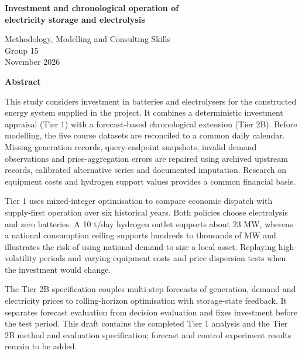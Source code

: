 \documentclass[11pt,a4paper,oneside]{article}
\begin{document}
\begin{center}
{\Large\bfseries Investment and chronological operation of\\[3pt]
electricity storage and electrolysis\par}
\vspace{12pt}
Methodology, Modelling and Consulting Skills\\
Group 15\\
November 2026
\end{center}
\vspace{16pt}
\begin{center}\large\bfseries Abstract\end{center}
\noindent
This study considers investment in batteries and electrolysers for the
constructed energy system supplied in the project. It combines a deterministic
investment appraisal (Tier 1) with a forecast-based chronological extension
(Tier 2B). Before modelling, the five course datasets are reconciled to a
common daily calendar. Missing generation records, query-endpoint snapshots,
invalid demand observations and price-aggregation errors are repaired using
archived upstream records, calibrated alternative series and documented
imputation. Research on equipment costs and hydrogen support values provides
a common financial basis.

Tier 1 uses mixed-integer optimisation to compare economic dispatch with
supply-first operation over six historical years. Both policies choose
electrolysis and zero batteries. A 10 t/day hydrogen outlet supports about
23 MW, whereas a national consumption ceiling supports hundreds to thousands
of MW and illustrates the risk of using national demand to size a local asset.
Replaying high-volatility periods and varying equipment costs and price
dispersion tests when the investment would change.

The Tier 2B specification couples multi-step forecasts of generation, demand
and electricity prices to rolling-horizon optimisation with storage-state
feedback. It separates forecast evaluation from decision evaluation and fixes
investment before the test period. This draft contains the completed Tier 1
analysis and the Tier 2B method and evaluation specification; forecast and
control experiment results remain to be added.
\clearpage
\tableofcontents
\clearpage
{}



\label{body-last}
\clearpage
\setcounter{page}{1}
\renewcommand{\thepage}{R\arabic{page}}

\end{document}
